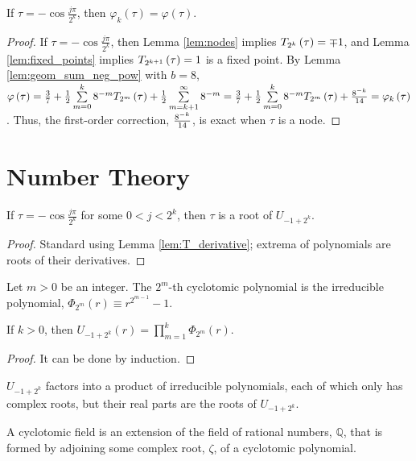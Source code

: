 \begin{lemma}
  \label{lem:magic}
  If $\tau = -\cos\frac{j\pi}{2^k}$, then $\varphi_k\left(\tau\right) = \varphi\left(\tau\right)$.
\end{lemma}
\begin{proof}
  If $\tau = -\cos\frac{j\pi}{2^k}$, then Lemma \ref{lem:nodes} implies $\TT[\tau]{k} = \mp 1$, and Lemma \ref{lem:fixed_points} implies $\TT[\tau]{k + 1} = 1$ is a fixed point. By Lemma \ref{lem:geom_sum_neg_pow} with $b = 8$, $\varphi\left(\tau\right) = \threesevenths + \halfsum{0}{k}{\tau} + \frac{1}{2}\sum\limits_{m = k + 1}^\infty 8^{-m} = \threesevenths + \halfsum{0}{k}{\tau} + \offset = \varphi_k\left(\tau\right)$. Thus, the first-order correction, $\frac{8^{-k}}{14}$, is exact when $\tau$ is a node.
\end{proof}

\section{Number Theory}\label{sec:NumberTheory}

\begin{lemma}
  \label{lem:extrema}
  If $\tau = -\cos\frac{j\pi}{2^k}$ for some $0 < j < 2^k$, then $\tau$ is a root of $U_{-1 + 2^k}$.
\end{lemma}
\begin{proof}
  Standard using Lemma \ref{lem:T_derivative}; extrema of polynomials are roots of their derivatives.
\end{proof}

\begin{definition}
  Let $m > 0$ be an integer. The $2^m$-th cyclotomic polynomial is the irreducible polynomial, $\Phi_{2^m}\left(r\right) \equiv r^{2^{m - 1}} - 1$.
\end{definition}

\begin{lemma}
  \label{lem:factorization}
  If $k > 0$, then $U_{-1 + 2^k}\left(r\right) = \prod\limits_{m = 1}^k \Phi_{2^m}\left(r\right)$.
\end{lemma}
\begin{proof}
  It can be done by induction.
\end{proof}
\begin{remark*}
$U_{-1 + 2^k}$ factors into a product of irreducible polynomials, each of which only has complex roots, but their real parts are the roots of $U_{-1 + 2^k}$.
\end{remark*}
\begin{definition}
  A cyclotomic field is an extension of the field of rational numbers, $\mathbb{Q}$, that is formed by adjoining some complex root, $\zeta$, of a cyclotomic polynomial.
\end{definition}

